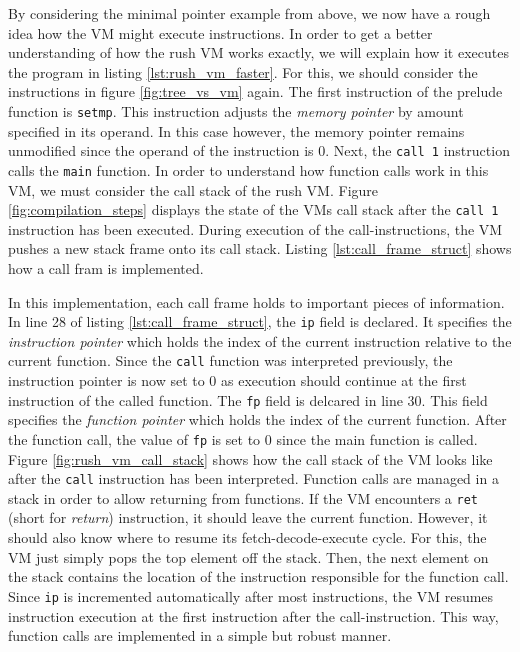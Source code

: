 By considering the minimal pointer example from above, we now have a rough idea how the VM might execute instructions.
In order to get a better understanding of how the rush VM works exactly, we will explain how it executes the program in listing \ref{lst:rush_vm_faster}.
For this, we should consider the instructions in figure \ref{fig:tree_vs_vm} again.
The first instruction of the prelude function is \texttt{setmp}.
This instruction adjusts the \emph{memory pointer} by amount specified in its operand.
In this case however, the memory pointer remains unmodified since the operand of the instruction is 0.
Next, the \texttt{call 1} instruction calls the \texttt{main} function.
In order to understand how function calls work in this VM, we must consider the call stack of the rush VM.
Figure \ref{fig:compilation_steps} displays the state of the VMs call stack after the \texttt{call 1} instruction has been executed.
During execution of the call-instructions, the VM pushes a new stack frame onto its call stack.
Listing \ref{lst:call_frame_struct} shows how a call fram is implemented.


In this implementation, each call frame holds to important pieces of information.
In line 28 of listing \ref{lst:call_frame_struct}, the \texttt{ip} field is declared.
It specifies the \emph{instruction pointer} which holds the index of the current instruction relative to the current function.
Since the \texttt{call} function was interpreted previously, the instruction pointer is now set to 0 as execution should continue at the first instruction of the called function.
The \texttt{fp} field is delcared in line 30.
This field specifies the \emph{function pointer} which holds the index of the current function.
After the function call, the value of \texttt{fp} is set to 0 since the main function is called.
Figure \ref{fig:rush_vm_call_stack} shows how the call stack of the VM looks like after the \texttt{call} instruction has been interpreted.
Function calls are managed in a stack in order to allow returning from functions.
If the VM encounters a \texttt{ret} (short for \emph{return}) instruction, it should leave the current function.
However, it should also know where to resume its fetch-decode-execute cycle.
For this, the VM just simply pops the top element off the stack.
Then, the next element on the stack contains the location of the instruction responsible for the function call.
Since \texttt{ip} is incremented automatically after most instructions, the VM resumes instruction execution at the first instruction after the call-instruction.
This way, function calls are implemented in a simple but robust manner.


